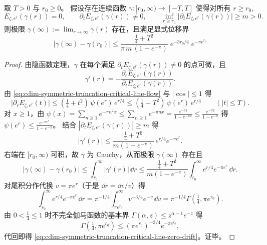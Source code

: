 \begin{theorem}[临界线零点分支的超指数漂移界]\label{thm:cdim-symmetric-truncation-critical-line-zero-drift}
取 \(T>0\) 与 \(r_0\ge 0\)。
假设存在连续函数 \(\gamma:[r_0,\infty)\to[-T,T]\) 使得对所有 \(r\ge r_0\),
\[
E_{\zeta,e^r}(\gamma(r))=0,
\qquad
\partial_t E_{\zeta,e^r}(\gamma(r))\neq 0,
\qquad
\inf_{r\ge r_0}\bigl|\partial_t E_{\zeta,e^r}(\gamma(r))\bigr|\ge m>0.
\]
则极限 \(\gamma(\infty):=\lim_{r\to\infty}\gamma(r)\) 存在，且满足显式位移界
\begin{equation}\label{eq:cdim-symmetric-truncation-critical-line-zero-drift}
\boxed{\;
|\gamma(\infty)-\gamma(r_0)|
\le
\frac{\tfrac14+T^2}{\pi\,m\,(1-e^{-\pi})}\;
e^{-3r_0/4}\;
e^{-\pi e^{r_0}}\;}
\end{equation}
\end{theorem}
\begin{proof}
由隐函数定理，\(\gamma\) 在每个满足 \(\partial_t E_{\zeta,e^r}(\gamma(r))\neq 0\) 的点可微，且
\[
\gamma'(r)=-\frac{\partial_r E_{\zeta,e^r}(\gamma(r))}{\partial_t E_{\zeta,e^r}(\gamma(r))}.
\]
由 \eqref{eq:cdim-symmetric-truncation-critical-line-flow} 与 \(|\cos|\le 1\) 得
\[
\bigl|\partial_r E_{\zeta,e^r}(t)\bigr|
\le (\tfrac14+t^2)\,\psi(e^r)\,e^{r/4}
\le (\tfrac14+T^2)\,\psi(e^r)\,e^{r/4}
\qquad(|t|\le T).
\]
对 \(x\ge 1\)，由 \(\psi(x)=\sum_{n\ge 1}e^{-\pi n^2 x}\le \sum_{n\ge 1}e^{-\pi n x}=\frac{e^{-\pi x}}{1-e^{-\pi x}}\le \frac{e^{-\pi x}}{1-e^{-\pi}}\) 得
\(
\psi(e^r)\le \frac{e^{-\pi e^r}}{1-e^{-\pi}}
\)。
结合 \(|\partial_t E_{\zeta,e^r}(\gamma(r))|\ge m\) 得
\[
|\gamma'(r)|
\le
\frac{\tfrac14+T^2}{m(1-e^{-\pi})}\,e^{r/4}e^{-\pi e^r}.
\]
右端在 \([r_0,\infty)\) 可积，故 \(\gamma\) 为 Cauchy，从而极限 \(\gamma(\infty)\) 存在且
\[
|\gamma(\infty)-\gamma(r_0)|
\le \int_{r_0}^{\infty}|\gamma'(r)|\,\dd r
\le
\frac{\tfrac14+T^2}{m(1-e^{-\pi})}\int_{r_0}^{\infty}e^{r/4}e^{-\pi e^r}\,\dd r.
\]
对尾积分作代换 \(v=\pi e^r\)（于是 \(\dd r=\dd v/v\)）得
\[
\int_{r_0}^{\infty}e^{r/4}e^{-\pi e^r}\,\dd r
=\pi^{-1/4}\int_{\pi e^{r_0}}^{\infty} v^{-3/4}e^{-v}\,\dd v
=\pi^{-1/4}\Gamma\!\left(\tfrac14,\pi e^{r_0}\right).
\]
由 \(0<\tfrac14\le 1\) 时不完全伽马函数的基本界
\(
\Gamma(\alpha,z)\le z^{\alpha-1}e^{-z}
\)
得
\[
\Gamma\!\left(\tfrac14,\pi e^{r_0}\right)\le (\pi e^{r_0})^{-3/4}e^{-\pi e^{r_0}},
\]
代回即得 \eqref{eq:cdim-symmetric-truncation-critical-line-zero-drift}。证毕。
\end{proof}

